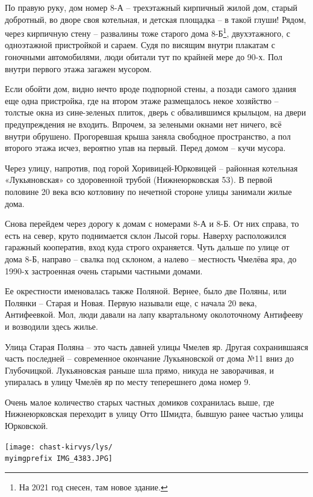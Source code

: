 По правую руку, дом номер 8-А – трехэтажный кирпичный жилой дом, старый добротный, во дворе своя котельная, и детская площадка – в такой глуши! Рядом, через кирпичную стену – развалины тоже старого дома 8-Б\footnote{На 2021 год снесен, там новое здание.}, двухэтажного, с одноэтажной пристройкой и сараем. Судя по висящим внутри плакатам с гоночными автомобилями, люди обитали тут по крайней мере до 90-х. Пол внутри первого этажа загажен мусором. 

Если обойти дом, видно нечто вроде подпорной стены, а позади самого здания еще одна пристройка, где на втором этаже размещалось некое хозяйство – толстые окна из сине-зеленых плиток, дверь с обвалившимся крыльцом, на двери предупреждения не входить. Впрочем, за зелеными окнами нет ничего, всё внутри обрушено. Прогоревшая крыша заняла свободное пространство, а пол второго этажа исчез, вероятно упав на первый. Перед домом – кучи мусора.

Через улицу, напротив, под горой Хоривицей-Юрковицей – районная котельная «Лукьяновская» со здоровенной трубой (Нижнеюрковская 53). В первой половине 20 века всю котловину по нечетной стороне улицы занимали жилые дома.

Снова перейдем через дорогу к домам с номерами 8-А и 8-Б. От них справа, то есть на север, круто поднимается склон Лысой горы. Наверху расположился гаражный кооператив, вход куда строго охраняется. Чуть дальше по улице от дома 8-Б, направо – свалка под склоном, а налево – местность Чмелёва яра, до 1990-х застроенная очень старыми частными домами.

Ее окрестности именовалась также Поляной. Вернее, было две Поляны, или Полянки – Старая и Новая. Первую называли еще, с начала 20 века, Антифеевкой. Мол, люди давали на лапу квартальному околоточному Антифееву и возводили здесь жилье.

Улица Старая Поляна – это часть давней улицы Чмелев яр. Другая сохранившаяся часть последней – современное окончание Лукьяновской от дома №11 вниз до Глубочицкой. Лукьяновская раньше шла прямо, никуда не заворачивая, и упиралась в улицу Чмелёв яр по месту теперешнего дома номер 9.

Очень малое количество старых частных домиков сохранилась выше, где Нижнеюрковская переходит в улицу Отто Шмидта, бывшую ранее частью улицы Юрковской. 

\newpage
\vspace*{\fill}
\begin{center}
\texttt{[image: chast-kirvys/lys/\\myimgprefix IMG\_4383.JPG]}
\end{center} 

